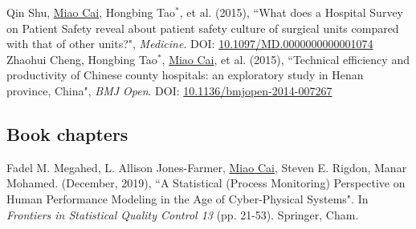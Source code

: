 \documentclass[11pt, a4paper]{article}
\newcommand{\years}[1]{\marginnote{\scriptsize #1}}
\begin{document}
\years{2015}Qin Shu, \underline{Miao Cai}, Hongbing Tao$^\ast$, et al. (2015), ``What does a Hospital Survey on Patient Safety reveal about patient safety culture of surgical units compared with that of other units?", \emph{Medicine}. DOI: \href{https://doi.org/10.1097/MD.0000000000001074}{10.1097/MD.0000000000001074}\\
\years{2015}Zhaohui Cheng, Hongbing Tao$^\ast$, \underline{Miao Cai}, et al. (2015), ``Technical efficiency and productivity of Chinese county hospitals: an exploratory study in Henan province, China", \emph{BMJ Open}. DOI: \href{https://doi.org/10.1136/bmjopen-2014-007267}{10.1136/bmjopen-2014-007267}


\subsection*{Book chapters}
\years{2019}Fadel M. Megahed, L. Allison Jones-Farmer, \underline{Miao Cai}, Steven E. Rigdon, Manar Mohamed. (December, 2019), ``A Statistical (Process Monitoring) Perspective on Human Performance Modeling in the Age of Cyber-Physical Systems". In \textit{Frontiers in Statistical Quality Control 13} (pp. 21-53). Springer, Cham.
\end{document}
